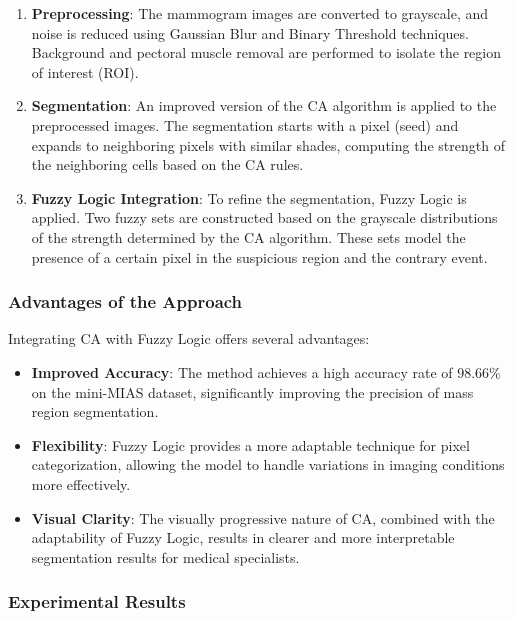 \documentclass[9pt,a4paper,twoside]{tau-class/tau}
\begin{document}
\begin{enumerate}
    \item \textbf{Preprocessing}: The mammogram images are converted to grayscale, and noise is reduced using Gaussian Blur and Binary Threshold techniques. Background and pectoral muscle removal are performed to isolate the region of interest (ROI).

    \item \textbf{Segmentation}: An improved version of the CA algorithm is applied to the preprocessed images. The segmentation starts with a pixel (seed) and expands to neighboring pixels with similar shades, computing the strength of the neighboring cells based on the CA rules. 

    \item \textbf{Fuzzy Logic Integration}: To refine the segmentation, Fuzzy Logic is applied. Two fuzzy sets are constructed based on the grayscale distributions of the strength determined by the CA algorithm. These sets model the presence of a certain pixel in the suspicious region and the contrary event.
\end{enumerate}

\subsubsection{Advantages of the Approach}


Integrating CA with Fuzzy Logic offers several advantages:

\begin{itemize}
    \item \textbf{Improved Accuracy}: The method achieves a high accuracy rate of 98.66\% on the mini-MIAS dataset, significantly improving the precision of mass region segmentation.
    \item \textbf{Flexibility}: Fuzzy Logic provides a more adaptable technique for pixel categorization, allowing the model to handle variations in imaging conditions more effectively.
    \item \textbf{Visual Clarity}: The visually progressive nature of CA, combined with the adaptability of Fuzzy Logic, results in clearer and more interpretable segmentation results for medical specialists.
\end{itemize}

\subsubsection{Experimental Results}
\end{document}

